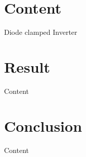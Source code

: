 \documentclass[
	11pt, %
]{beamer}
\begin{document}

\section{Content}
\begin{frame}{Diode clamped Inverter}
	
\end{frame}



\section{Result}
\begin{frame}{Content}
	
\end{frame}


\section{Conclusion}
\begin{frame}{Content}
	
\end{frame}











\begin{frame}[plain] %
	\begin{center}
		{}
            
	\end{center}
\end{frame}
\end{document}
